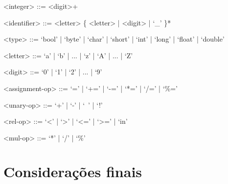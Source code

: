\documentclass[
	article,			%
	11pt,				%
	oneside,			%
	a4paper,			%
	english,			%
	brazil,				%
	sumario=tradicional
	]{abntex2}
\begin{document}
\begin{grammar}
	<integer> ::= <digit>+
	
	<identifier> ::= <letter> \{ <letter> | <digit> | `_' \}*
	
	<type> ::= `bool' | `byte' | `char' | `short' | `int' | `long' | `float' | `double'
	
	<letter> ::= `a' | `b' | ... | `z' | `A' | ... | `Z'
	
	<digit> ::= `0' | `1' | `2' | ... | `9'
	
	<assignment-op> ::= `=' | `+=' | `-=' | `*=' | `/=' | `\%='
	
	<unary-op> ::= `+' | `-' | `~' | `!'
	
	<rel-op> ::= `<' | `>' | `<=' | `>=' | `in'
	
	<mul-op> ::= `*' | `/' | `\%'
	
\end{grammar}

% 

\section{Considerações finais}



\postextual



%
%



\end{document}
